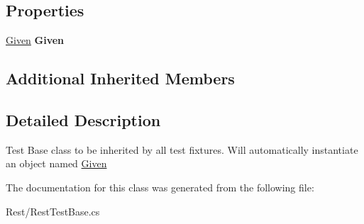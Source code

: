 \subsection*{Properties}
\begin{DoxyCompactItemize}
\item 
\hypertarget{class_proto_test_1_1_golem_1_1_rest_1_1_rest_test_base_abcad4795bedd154b9934acfc3ba8ac8e}{\hyperlink{class_proto_test_1_1_golem_1_1_rest_1_1_given}{Given} {\bfseries Given}}\label{class_proto_test_1_1_golem_1_1_rest_1_1_rest_test_base_abcad4795bedd154b9934acfc3ba8ac8e}

\end{DoxyCompactItemize}
\subsection*{Additional Inherited Members}


\subsection{Detailed Description}
Test Base class to be inherited by all test fixtures. Will automatically instantiate an object named \hyperlink{class_proto_test_1_1_golem_1_1_rest_1_1_given}{Given} 



The documentation for this class was generated from the following file\-:\begin{DoxyCompactItemize}
\item 
Rest/Rest\-Test\-Base.\-cs\end{DoxyCompactItemize}
